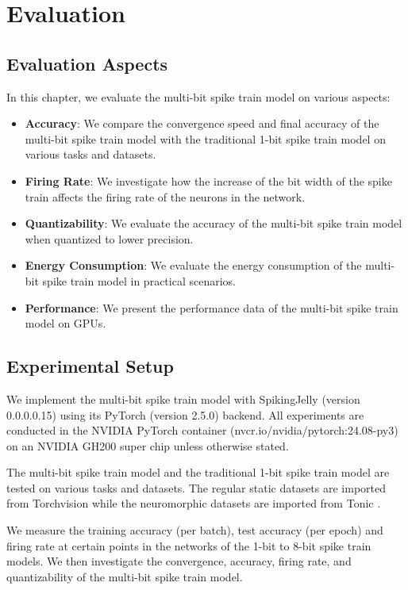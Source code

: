 \chapter{Evaluation}
\label{chap:evaluation}

\section{Evaluation Aspects}
\label{sec:evaluation-aspects}
    In this chapter, we evaluate the multi-bit spike train model on various aspects: 
    \begin{itemize}
        \item \textbf{Accuracy}: We compare the convergence speed and final accuracy of the multi-bit spike train model with the traditional 1-bit spike train model on various tasks and datasets.
        \item \textbf{Firing Rate}: We investigate how the increase of the bit width of the spike train affects the firing rate of the neurons in the network.
        \item \textbf{Quantizability}: We evaluate the accuracy of the multi-bit spike train model when quantized to lower precision.
        \item \textbf{Energy Consumption}: We evaluate the energy consumption of the multi-bit spike train model in practical scenarios.
        \item \textbf{Performance}: We present the performance data of the multi-bit spike train model on GPUs. 
    \end{itemize}

\section{Experimental Setup}
\label{sec:experimental-setup}
    We implement the multi-bit spike train model with SpikingJelly \cite{doi:10.1126/sciadv.adi1480} (version 0.0.0.0.15) using its PyTorch \cite{NEURIPS2019_9015} (version 2.5.0) backend. All experiments are conducted in the NVIDIA PyTorch container (nvcr.io/nvidia/pytorch:24.08-py3) on an NVIDIA GH200 super chip unless otherwise stated. 

    The multi-bit spike train model and the traditional 1-bit spike train model are tested on various tasks and datasets. The regular static datasets are imported from Torchvision \cite{10.1145/1873951.1874254} while the neuromorphic datasets are imported from Tonic \cite{lenz_2021_5079802}. 

    We measure the training accuracy (per batch), test accuracy (per epoch) and firing rate at certain points in the networks of the 1-bit to 8-bit spike train models. We then investigate the convergence, accuracy, firing rate, and quantizability of the multi-bit spike train model. 

